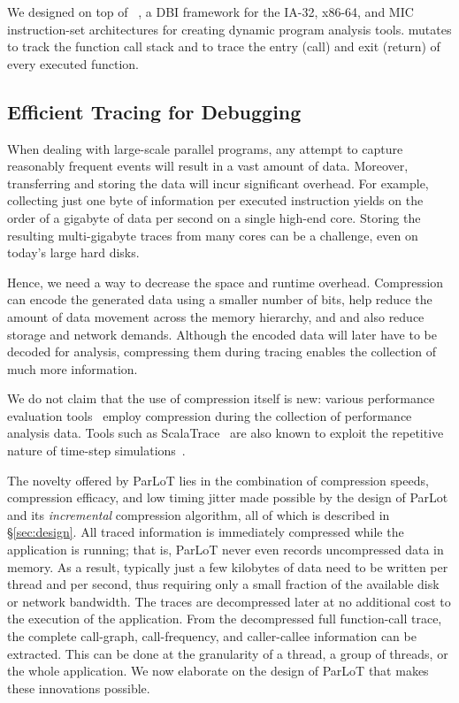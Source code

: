 We designed \parlot on top of \pin~\cite{pin}, a DBI framework for the IA-32, x86-64, and MIC instruction-set architectures for creating dynamic program analysis tools. \parlot mutates \pin to track the function call stack and to trace the entry (call) and exit (return) of every executed function.


\subsection{Efficient Tracing for Debugging}
When dealing with large-scale parallel programs, any attempt to capture reasonably frequent events will result in a vast amount of data. Moreover, transferring and storing the data will incur significant overhead. For example, collecting just one byte of information per executed instruction yields on the order of a gigabyte of data per second on a single high-end core. Storing the resulting multi-gigabyte traces from many cores can be a challenge, even on today's large hard disks.

Hence, we need a way to decrease the space and runtime overhead. Compression can encode the generated data using a smaller number of bits, help
reduce the amount of data movement across the memory hierarchy, and
and also reduce storage and network demands.
%
Although the encoded data will later have to be decoded for analysis, compressing them during tracing enables the collection of much more information.

We do not claim that the use of compression itself is new:
various performance evaluation tools~\cite{tau,scorep,eventflowgraph} 
employ compression during the collection
of performance analysis data.
%
Tools such as ScalaTrace~\cite{scalatrace}
are also known to exploit
the repetitive nature of time-step simulations~\cite{freitag}. 


The novelty offered by ParLoT lies in the combination of compression
speeds, compression efficacy, and low timing jitter
made possible by the design of ParLot and its {\em incremental}
compression algorithm, all of which is
described in \S\ref{sec:design}.
%
All traced information is immediately compressed while the application is running; that is, ParLoT
never even records uncompressed data in memory. 
%
As a result, typically just a few kilobytes of data need to be written per thread and per second, thus requiring only a small fraction of the available disk or network bandwidth. 
%
The traces are decompressed later at no additional cost to the execution of the application. 
%
From the decompressed full function-call trace, the complete call-graph, 
call-frequency, and caller-callee information can be extracted. 
%
This can be done at the granularity of a thread, a group of threads, or the whole application.
%
We now elaborate on the design of ParLoT that makes
these innovations possible.






